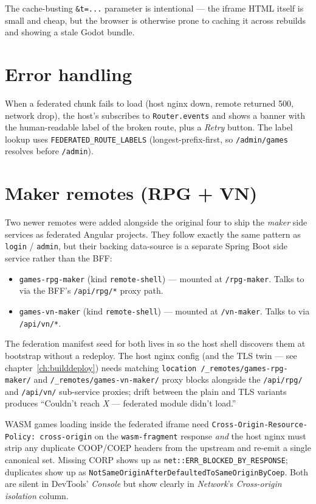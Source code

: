 The cache-busting \texttt{\&t=...} parameter is intentional — the iframe
HTML itself is small and cheap, but the browser is otherwise prone to
caching it across rebuilds and showing a stale Godot bundle.

\section{Error handling}

When a federated chunk fails to load (host nginx down, remote returned
500, network drop), the host's
 subscribes to \texttt{Router.events} and shows a
banner with the human-readable label of the broken route, plus a
\textit{Retry} button. The label lookup uses
\texttt{FEDERATED\_ROUTE\_LABELS} (longest-prefix-first, so
\texttt{/admin/games} resolves before \texttt{/admin}).

\section{Maker remotes (RPG + VN)}

Two newer remotes were added alongside the original four to ship the
\emph{maker} side services as federated Angular projects. They follow
exactly the same pattern as \texttt{login} / \texttt{admin}, but their
backing data-source is a separate Spring Boot side service rather than
the BFF:

\begin{itemize}
  \item \texttt{games-rpg-maker} (kind \texttt{remote-shell}) ---
        mounted at \texttt{/rpg-maker}. Talks to
         via the BFF's \texttt{/api/rpg/*} proxy
        path.
  \item \texttt{games-vn-maker} (kind \texttt{remote-shell}) ---
        mounted at \texttt{/vn-maker}. Talks to 
        via \texttt{/api/vn/*}.
\end{itemize}

The federation manifest seed for both lives in
so the host shell discovers them at bootstrap without a redeploy. The
host nginx config (and the TLS twin --- see chapter~\ref{ch:builddeploy})
needs matching \texttt{location /\_remotes/games-rpg-maker/}
and \texttt{/\_remotes/games-vn-maker/} proxy blocks alongside the
\texttt{/api/rpg/} and \texttt{/api/vn/} sub-service proxies; drift
between the plain and TLS variants produces ``Couldn't reach \emph{X}
--- federated module didn't load.''

\begin{snapcaution}[title={CORP saves WASM iframes}]
WASM games loading inside the federated iframe need
\texttt{Cross-Origin-Resource-Policy: cross-origin} on the
\texttt{wasm-fragment} response \emph{and} the host nginx must strip any
duplicate COOP/COEP headers from the upstream and re-emit a single
canonical set. Missing CORP shows up as
\texttt{net::ERR\_BLOCKED\_BY\_RESPONSE}; duplicates show up as
\texttt{NotSameOriginAfterDefaultedToSameOriginByCoep}. Both are silent
in DevTools' \emph{Console} but show clearly in \emph{Network}'s
\textit{Cross-origin isolation} column.
\end{snapcaution}

